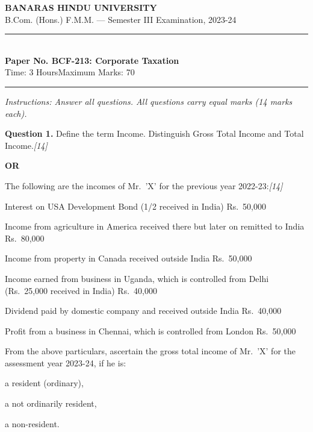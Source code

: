 \documentclass[11pt,a4paper]{article}
\newcommand{\pts}[1]{\hfill   \textit{[#1]}}
\begin{document}
\begin{center}
  {\large\bfseries BANARAS HINDU UNIVERSITY}\\[2pt]
  {\normalsize B.Com. (Hons.) F.M.M. --- Semester III Examination, 2023-24}\\[6pt]
  \rule{0.8\linewidth}{0.5pt}\\[6pt]
  {\large\bfseries Paper No. BCF-213: Corporate Taxation}\\[4pt]
  {\normalsize Time: 3 Hours\hfill Maximum Marks: 70}
\end{center}

\rule{\linewidth}{0.4pt}

\smallskip



\noindent   \textit{Instructions: Answer all questions. All questions carry equal marks (14 marks each).}

\bigskip




\noindent   \textbf{Question 1.}
Define the term Income. Distinguish Gross Total Income and Total Income.\pts{14}

\centerline{   \textbf{OR}}

The following are the incomes of Mr.\ 'X' for the previous year 2022-23:\pts{14}

\begin{parts}
  \item Interest on USA Development Bond (1/2 received in India) \hfill Rs.\ 50,000
  \item Income from agriculture in America received there but later on remitted to India \hfill Rs.\ 80,000
  \item Income from property in Canada received outside India \hfill Rs.\ 50,000
  \item Income earned from business in Uganda, which is controlled from Delhi (Rs.\ 25,000 received in India) \hfill Rs.\ 40,000
  \item Dividend paid by domestic company and received outside India \hfill Rs.\ 40,000
  \item Profit from a business in Chennai, which is controlled from London \hfill Rs.\ 50,000
\end{parts}
From the above particulars, ascertain the gross total income of Mr.\ 'X' for the assessment year 2023-24, if he is:

\begin{parts}
  \item a resident (ordinary),
  \item a not ordinarily resident,
  \item a non-resident.
\end{parts}
\end{document}
